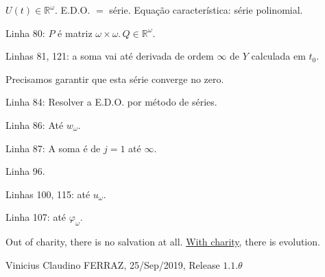 \documentclass[12pt]{article}
\begin{document}
$U(t) \in \mathbb{R}^{\omega}$. E.D.O. $=$ s\'erie. Equa\c{c}\~ao caracter\'istica: s\'erie polinomial.

Linha 80: $P$ \'e matriz $\omega \times \omega.\,Q \in \mathbb{R}^{\omega}$.

Linhas 81, 121: a soma vai at\'e derivada de ordem $\infty$ de $Y$ calculada em $t_0$.

Precisamos garantir que esta s\'erie converge no zero.

Linha 84: Resolver a E.D.O. por m\'etodo de s\'eries.

Linha 86: At\'e $w_{\omega}$.

Linha 87: A soma \'e de $j = 1$ at\'e $\infty$.

Linha 96.

Linhas 100, 115: at\'e $u_{\omega}$.

Linha 107: at\'e $\varphi_{\omega}$.

\vspace{3mm}

Out of charity, there is no salvation at all. \href{https://drive.google.com/file/d/1l2XnHYek5VWSxtVVsIWLKNwLcKgxNieu/view?fbclid=IwAR22CEy05D_VdGCcmYBvwAkaPprEL7o-oM_FszihQ2DobT-rjrNCFqggamE}{\underline{With charity}}, there is evolution.

\vspace{3mm}

Vinicius Claudino FERRAZ, 25/Sep/2019, Release $1.1.\theta$
\end{document}
